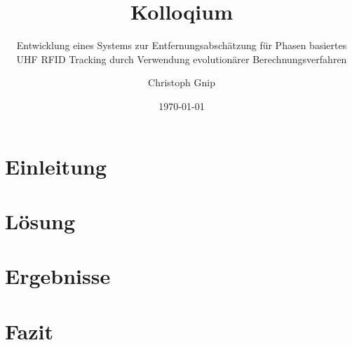 \documentclass{beamer}
\title{Kolloqium}
\subtitle{Entwicklung eines Systems zur
			  Entfernungsabschätzung für
			  Phasen basiertes UHF 
			  RFID Tracking durch 
			  Verwendung evolutionärer
			  Berechnungsverfahren}
\author{Christoph Gnip}
\date{\today}
\begin{document}
\maketitle
\frame{\tableofcontents}

\section{Einleitung}

\section{Lösung}

\section{Ergebnisse}

\section{Fazit}

\end{document}
